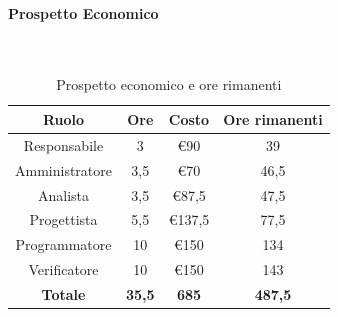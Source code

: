 \documentclass{article}
\begin{document}
                \paragraph{Prospetto Economico}\mbox{}\\
                \begin{table}[H]
                    \centering
                    \begin{tabular}{|c|c|c|c|}
                    \hline
                    \textbf{Ruolo}  & \textbf{Ore}  & \textbf{Costo} & \textbf{Ore rimanenti} \\ \hline
                    Responsabile    & 3             & €90            & 39                     \\ \hline
                    Amministratore  & 3,5           & €70            & 46,5                   \\ \hline
                    Analista        & 3,5           & €87,5          & 47,5                   \\ \hline
                    Progettista     & 5,5           & €137,5         & 77,5                   \\ \hline
                    Programmatore   & 10            & €150           & 134                    \\ \hline
                    Verificatore    & 10            & €150           & 143                    \\ \hline
                    \textbf{Totale} & \textbf{35,5} & \textbf{685}   & \textbf{487,5}         \\ \hline
                    \end{tabular}
                    \caption{Prospetto economico e ore rimanenti}
                \end{table}
\end{document}
